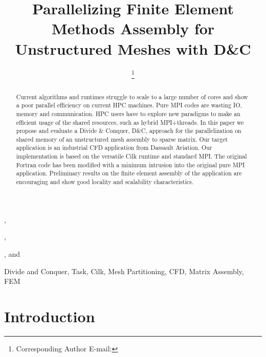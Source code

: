 \documentclass{IOS-Book-Article}
\begin{document}
\begin{frontmatter}              %

\title{Parallelizing Finite Element Methods Assembly for Unstructured Meshes with D\&C}

\author[A]{ %
\thanks{Corresponding Author E-mail: }},
\author[A]{ },
\author[A]{ },
and
\author[B]{ }

\address[A]{PRISM - University of Versailles, France}
\address[B]{Dassault Aviation, Saint-Cloud, France}

\begin{abstract}
Current algorithms and runtimes struggle to scale to a large number of cores and show a poor parallel efficiency on current HPC machines.
Pure MPI codes are wasting IO, memory and communication. HPC users have to explore new paradigms to make an efficient usage of the shared resources,
such as hybrid MPI+threads.
In this paper we propose and evaluate a Divide \& Conquer, D\&C, approach for the parallelization on shared memory of an unstructured mesh assembly to sparse matrix.
Our target application is an industrial CFD application from Dassault Aviation.
Our implementation is based on the versatile Cilk runtime and standard MPI.
The original Fortran code has been modified with a minimum intrusion into the original pure MPI application.
Preliminary results on the finite element assembly of the application are encouraging and show good locality and scalability characteristics.
\end{abstract}

\begin{keyword}
Divide and Conquer, Task, Cilk, Mesh Partitioning, CFD, Matrix Assembly, FEM
\end{keyword}
\end{frontmatter}

\thispagestyle{empty}
\pagestyle{empty}

\section{Introduction}
\end{document}
